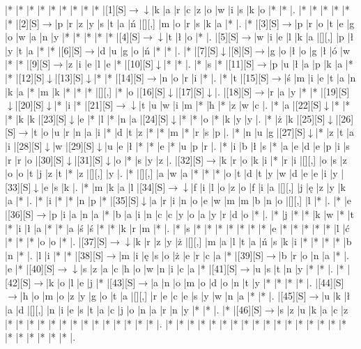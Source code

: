 \documentclass[11pt]{article}
\newcommand\drarr{$\rightarrow \!\!\!\!\! \downarrow$}
\newcommand\rarr{$\rightarrow$}
\newcommand\darr{$\downarrow$}
\begin{document}
\noindent\begin{Puzzle}{22}{26}|*	|*	|*	|*	|*	|*	|*	|*	|*	|[1][S]\drarr	|k	|a	|r	|c	|z	|o	|w	|i	|s	|k	|o	|*	|*	|.
|*	|*	|*	|*	|*	|*	|[2][S]\rarr	|p	|r	|z	|y	|s	|t	|a	|ń	|[][,]{ }	|m	|o	|r	|s	|k	|a	|*	|.
|*	|[3][S]\rarr	|p	|r	|o	|t	|e	|g	|o	|w	|a	|n	|y	|*	|*	|*	|*	|*	|[4][S]\drarr	|t	|ł	|o	|*	|.
|[5][S]\rarr	|w	|i	|e	|l	|k	|a	|[][,]{ }	|p	|ł	|y	|t	|a	|*	|*	|[6][S]\rarr	|d	|u	|g	|o	|ń	|*	|*	|.
|*	|[7][S]\darr	|[8][S]\rarr	|g	|o	|ł	|o	|g	|ł	|ó	|w	|*	|*	|[9][S]\rarr	|z	|i	|e	|l	|e	|*	|[10][S]\darr	|*	|*	|.
|*	|s	|*	|[11][S]\rarr	|p	|u	|ł	|a	|p	|k	|a	|*	|*	|[12][S]\darr	|[13][S]\darr	|*	|*	|[14][S]\rarr	|n	|o	|r	|i	|*	|.
|*	|t	|[15][S]\rarr	|ś	|m	|i	|e	|t	|a	|n	|k	|a	|*	|m	|k	|*	|*	|*	|[][,]{ }	|*	|o	|[16][S]\darr	|[17][S]\darr	|.
|[18][S]\rarr	|r	|a	|y	|*	|*	|[19][S]\darr	|[20][S]\darr	|*	|i	|*	|[21][S]\drarr	|t	|u	|w	|i	|m	|*	|h	|*	|z	|w	|c	|.
|*	|a	|[22][S]\darr	|*	|*	|*	|k	|k	|[23][S]\darr	|e	|*	|l	|*	|n	|a	|[24][S]\darr	|*	|*	|o	|*	|k	|y	|y	|.
|*	|ż	|k	|[25][S]\darr	|[26][S]\rarr	|t	|o	|u	|r	|n	|a	|i	|*	|d	|t	|z	|*	|*	|m	|*	|r	|s	|p	|.
|*	|n	|u	|g	|[27][S]\darr	|*	|z	|t	|a	|i	|[28][S]\darr	|w	|[29][S]\darr	|u	|e	|ł	|*	|*	|e	|*	|u	|p	|r	|.
|*	|i	|b	|ł	|s	|*	|a	|e	|d	|e	|p	|i	|s	|r	|r	|o	|[30][S]\darr	|[31][S]\darr	|o	|*	|s	|y	|z	|.
|[32][S]\rarr	|k	|r	|o	|k	|i	|*	|r	|i	|[][,]{ }	|o	|s	|z	|o	|o	|t	|j	|z	|t	|*	|z	|[][,]{ }	|y	|.
|*	|[][,]{ }	|a	|w	|a	|*	|*	|*	|o	|t	|d	|t	|y	|w	|d	|e	|e	|i	|y	|[33][S]\darr	|e	|s	|k	|.
|*	|m	|k	|a	|l	|[34][S]\drarr	|f	|i	|l	|o	|z	|o	|f	|i	|a	|[][,]{ }	|j	|ę	|z	|y	|k	|a	|*	|.
|*	|i	|*	|*	|n	|p	|*	|[35][S]\darr	|a	|r	|i	|n	|o	|e	|w	|m	|m	|b	|n	|o	|[][,]{ }	|l	|*	|.
|*	|e	|[36][S]\rarr	|p	|i	|a	|n	|a	|*	|b	|a	|i	|n	|c	|c	|y	|o	|a	|y	|r	|d	|o	|*	|.
|*	|j	|*	|*	|k	|w	|*	|t	|*	|i	|ł	|a	|*	|*	|a	|ś	|ś	|*	|*	|k	|r	|m	|*	|.
|*	|s	|*	|*	|*	|*	|*	|*	|*	|e	|*	|*	|*	|*	|*	|l	|ć	|*	|*	|*	|o	|o	|*	|.
|[37][S]\drarr	|k	|r	|z	|y	|ż	|[][,]{ }	|m	|a	|l	|t	|a	|ń	|s	|k	|i	|*	|*	|*	|*	|b	|n	|*	|.
|l	|i	|*	|*	|[38][S]\rarr	|m	|i	|ę	|s	|o	|ż	|e	|r	|c	|a	|*	|[39][S]\rarr	|b	|r	|o	|n	|a	|*	|.
|e	|*	|[40][S]\drarr	|s	|z	|a	|c	|h	|o	|w	|n	|i	|c	|a	|*	|[41][S]\rarr	|u	|s	|t	|n	|y	|*	|*	|.
|*	|[42][S]\rarr	|k	|o	|l	|e	|j	|*	|[43][S]\rarr	|a	|n	|o	|m	|o	|d	|o	|n	|t	|y	|*	|*	|*	|*	|.
|[44][S]\rarr	|h	|o	|m	|o	|z	|y	|g	|o	|t	|a	|[][,]{ }	|r	|e	|c	|e	|s	|y	|w	|n	|a	|*	|*	|.
|[45][S]\rarr	|u	|k	|ł	|a	|d	|[][,]{ }	|n	|i	|e	|s	|t	|a	|c	|j	|o	|n	|a	|r	|n	|y	|*	|*	|.
|*	|[46][S]\rarr	|s	|z	|u	|k	|a	|c	|z	|*	|*	|*	|*	|*	|*	|*	|*	|*	|*	|*	|*	|*	|*	|.
|*	|*	|*	|*	|*	|*	|*	|*	|*	|*	|*	|*	|*	|*	|*	|*	|*	|*	|*	|*	|*	|*	|*	|.\end{Puzzle}
\end{document}
